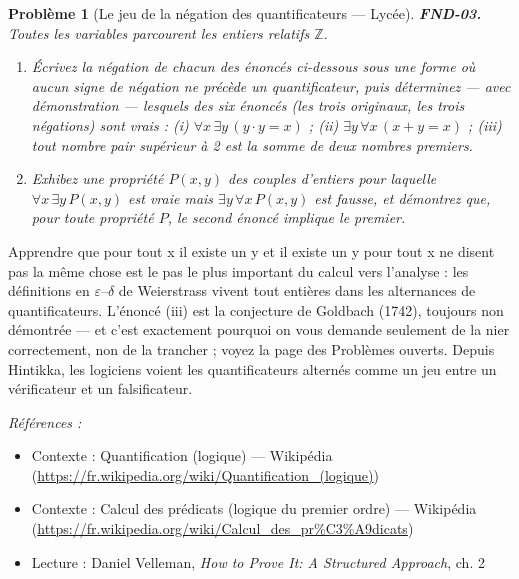 \documentclass[11pt]{article}
\newtheorem{problem}{Problème}
\newenvironment{refs}{\par\small\noindent\emph{Références :}\begin{itemize}\setlength\itemsep{0pt}}{\end{itemize}\normalsize}
\begin{document}
\begin{problem}[{Le jeu de la négation des quantificateurs --- Lycée}]
\textbf{FND-03.} Toutes les variables parcourent les entiers relatifs $\mathbb{Z}$.
\begin{enumerate}
\item[(a)] Écrivez la
négation de chacun des énoncés ci-dessous sous une forme où aucun signe de négation ne précède
un quantificateur, puis déterminez --- avec démonstration --- lesquels des six énoncés (les trois
originaux, les trois négations) sont vrais : (i) $ \forall x\, \exists y\, (y \cdot y = x) $ ;
(ii) $ \exists y\, \forall x\, (x + y = x) $ ; (iii) tout nombre pair supérieur à 2 est
la somme de deux nombres premiers.
\item[(b)] Exhibez une propriété $ P(x,y) $ des couples d'entiers pour
laquelle $ \forall x\, \exists y\, P(x,y) $ est vraie mais $ \exists y\, \forall x\, P(x,y) $
est fausse, et démontrez que, pour toute propriété $ P $, le second énoncé implique le premier.
\end{enumerate}

\end{problem}

\noindent Apprendre que \og{} pour tout x il existe un y \fg{} et \og{} il existe un y pour tout x \fg{}
ne disent pas la même chose est le pas le plus important du calcul vers l'analyse : les
définitions en $\varepsilon$--$\delta$ de Weierstrass vivent tout entières dans les alternances de quantificateurs.
L'énoncé (iii) est la conjecture de Goldbach (1742), toujours non démontrée --- et c'est
exactement pourquoi on vous demande seulement de la nier correctement, non de la trancher ;
voyez la page des Problèmes ouverts. Depuis Hintikka, les logiciens voient les quantificateurs
alternés comme un jeu entre un vérificateur et un falsificateur.

\begin{refs}
\item Contexte : Quantification (logique) --- Wikipédia (\url{https://fr.wikipedia.org/wiki/Quantification_(logique)})
\item Contexte : Calcul des prédicats (logique du premier ordre) --- Wikipédia (\url{https://fr.wikipedia.org/wiki/Calcul_des_pr%C3%A9dicats})
\item Lecture : Daniel Velleman, \textit{How to Prove It: A Structured Approach}, ch. 2
\end{refs}

\bigskip
\end{document}
